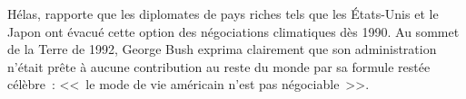 \documentclass[a5paper,french]{memoir}
\begin{document}
Hélas, \citet{bertram_tradeable_1992} rapporte que les diplomates de pays riches tels que les États-Unis et le Japon ont évacué cette option des négociations climatiques dès 1990. Au sommet de la Terre de 1992, George Bush exprima clairement que son administration n'était prête à aucune contribution au reste du monde par sa formule restée célèbre~: <<~le mode de vie américain n'est pas négociable~>>. %
\end{document}
